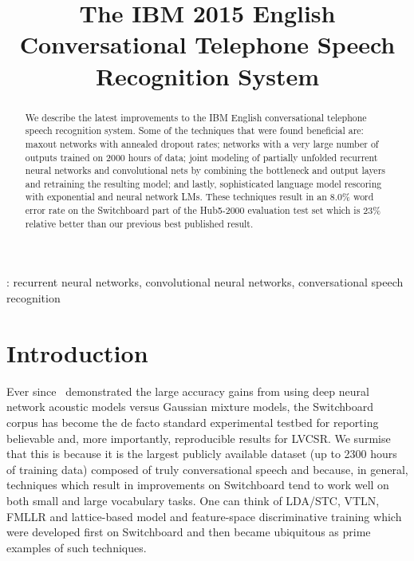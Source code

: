 \documentclass[a4paper]{article}
\title{The IBM 2015 English Conversational Telephone Speech Recognition System}
\begin{document}
\maketitle

\begin{abstract} 
We describe the latest improvements to the IBM English conversational
telephone speech recognition system. Some of the techniques that were
found beneficial are: maxout networks with annealed dropout rates;
networks with a very large number of outputs trained on 2000 hours of
data; joint modeling of partially unfolded recurrent neural networks
and convolutional nets by combining the bottleneck and output layers
and retraining the resulting model; and lastly, sophisticated language
model rescoring with exponential and neural network LMs. These
techniques result in an 8.0\% word error rate on the Switchboard part
of the Hub5-2000 evaluation test set which is 23\% relative better than
our previous best published result.
\end{abstract}

: recurrent neural networks, convolutional neural networks, conversational speech recognition

\section{Introduction}

Ever since~\cite{seide11} demonstrated the large accuracy gains from
using deep neural network acoustic models versus Gaussian mixture
models, the Switchboard corpus has become the de facto
standard experimental testbed for reporting believable and, more
importantly, reproducible results for LVCSR. We surmise that this is
because it is the largest publicly available dataset (up to 2300 hours
of training data) composed of truly conversational speech and because,
in general, techniques which result in improvements on Switchboard
tend to work well on both small and large vocabulary tasks. One can
think of LDA/STC, VTLN, FMLLR and lattice-based model and
feature-space discriminative training which were developed first on
Switchboard and then became ubiquitous as prime examples of such
techniques.
\end{document}
